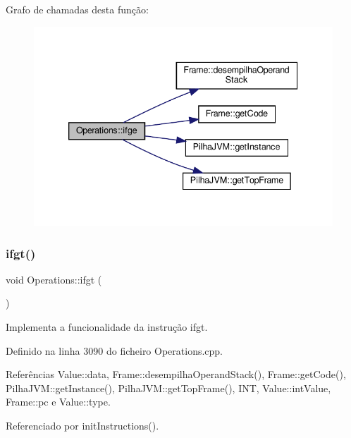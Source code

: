 Grafo de chamadas desta função\+:\nopagebreak
\begin{figure}[H]
\begin{center}
\leavevmode
\includegraphics[width=339pt]{classOperations_a0e7cf2111ad25ee52aa329cc6ec4d38a_cgraph}
\end{center}
\end{figure}
\mbox{\label{classOperations_afff52b972f58750ea8037aeb02dd22bc}} 
\subsubsection{\texorpdfstring{ifgt()}{ifgt()}}
{\footnotesize\ttfamily void Operations\+::ifgt (\begin{DoxyParamCaption}{ }\end{DoxyParamCaption})\hspace{0.3cm}{\ttfamily [private]}}



Implementa a funcionalidade da instrução ifgt. 



Definido na linha 3090 do ficheiro Operations.\+cpp.



Referências Value\+::data, Frame\+::desempilha\+Operand\+Stack(), Frame\+::get\+Code(), Pilha\+J\+V\+M\+::get\+Instance(), Pilha\+J\+V\+M\+::get\+Top\+Frame(), I\+NT, Value\+::int\+Value, Frame\+::pc e Value\+::type.



Referenciado por init\+Instructions().

